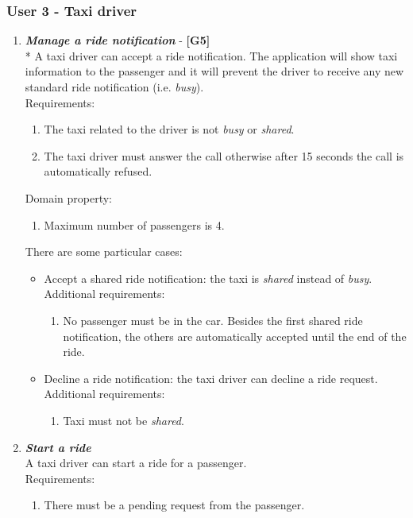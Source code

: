 \documentclass{article}
\begin{document}
\subsubsection{User 3 - Taxi driver}
\begin{enumerate}

\item \textit{\textbf{Manage a ride notification}} - \textbf{[G5]}\\*
A taxi driver can accept a ride notification. The application will show taxi information to the passenger and it will prevent the driver to receive any new standard ride notification  (i.e. \textit{busy}).\\
Requirements:
\begin{enumerate}
\item The taxi related to the driver is not \textit{busy} or \textit{shared}.
\item The taxi driver must answer the call otherwise after 15 seconds the call is automatically refused.
\end{enumerate}
Domain property:
\begin{enumerate}
\item Maximum number of passengers is 4.
\end{enumerate}
There are some particular cases:
\begin{itemize}
\item Accept a shared ride notification: the taxi is \textit{shared} instead of \textit{busy}.\\
Additional requirements:
\begin{enumerate}
\item No passenger must be in the car. Besides the first shared ride notification, the others are automatically accepted until the end of the ride.
\end{enumerate}
\item Decline a ride notification: the taxi driver can decline a ride request.\\
Additional requirements:
\begin{enumerate}
\item Taxi must not be \textit{shared}.
\end{enumerate}
\end{itemize}

\item \textit{\textbf{Start a ride}}\\
A taxi driver can start a ride for a passenger.\\
Requirements:
\begin{enumerate}
\item There must be a pending request from the passenger.
\end{enumerate}


\end{enumerate}
\end{document}
